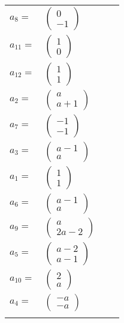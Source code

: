 \documentclass[1p]{elsarticle_modified}
\theoremstyle{definition}
\begin{document}
\begin{tabular}{m{7pt} m{180pt} m{7pt} m{180pt} }
\flushright $a_{8}=$&$\begin{pmatrix}0\\-1\end{pmatrix}$ \\
\flushright $a_{11}=$&$\begin{pmatrix}1\\0\end{pmatrix}$ \\
\flushright $a_{12}=$&$\begin{pmatrix}1\\1\end{pmatrix}$ \\
\flushright $a_{2}=$&$\begin{pmatrix}a\\a+1\end{pmatrix}$ \\
\flushright $a_{7}=$&$\begin{pmatrix}-1\\-1\end{pmatrix}$ \\
\flushright $a_{3}=$&$\begin{pmatrix}a-1\\a\end{pmatrix}$ \\
\flushright $a_{1}=$&$\begin{pmatrix}1\\1\end{pmatrix}$ \\
\flushright $a_{6}=$&$\begin{pmatrix}a-1\\a\end{pmatrix}$ \\
\flushright $a_{9}=$&$\begin{pmatrix}a\\2 a-2\end{pmatrix}$ \\
\flushright $a_{5}=$&$\begin{pmatrix}a-2\\a-1\end{pmatrix}$ \\
\flushright $a_{10}=$&$\begin{pmatrix}2\\a\end{pmatrix}$ \\
\flushright $a_{4}=$&$\begin{pmatrix}- a\\- a\end{pmatrix}$\\&\end{tabular}
\end{document}
